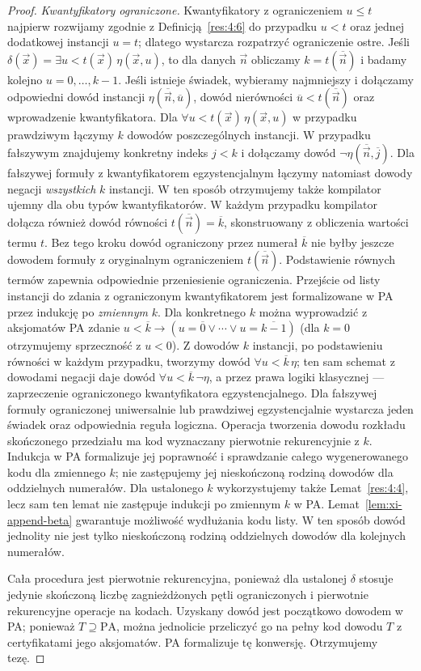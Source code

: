 \begin{proof}
\emph{Kwantyfikatory ograniczone.} Kwantyfikatory
z ograniczeniem $u\le t$ najpierw rozwijamy zgodnie
z Definicją~\ref{res:4:6} do przypadku $u<t$ oraz
jednej dodatkowej instancji $u=t$; dlatego wystarcza
rozpatrzyć ograniczenie ostre. Jeśli
$\delta(\vec x)=\exists u<t(\vec x)\,\eta(\vec x,u)$,
to dla danych $\vec n$ obliczamy
$k=t(\overline{\vec n})$ i badamy kolejno
$u=0,\ldots,k-1$. Jeśli istnieje świadek,
wybieramy najmniejszy i dołączamy odpowiedni
dowód instancji $\eta(\overline{\vec n},\overline u)$,
dowód nierówności $\overline u<t(\overline{\vec n})$
oraz wprowadzenie kwantyfikatora. Dla
$\forall u<t(\vec x)\,\eta(\vec x,u)$ w przypadku
prawdziwym łączymy $k$ dowodów poszczególnych
instancji. W przypadku fałszywym znajdujemy
konkretny indeks $j<k$ i dołączamy dowód
$\neg\eta(\overline{\vec n},\overline j)$.
Dla fałszywej formuły z kwantyfikatorem egzystencjalnym
łączymy natomiast dowody negacji \emph{wszystkich}
$k$ instancji. W ten sposób otrzymujemy także
kompilator ujemny dla obu typów kwantyfikatorów.
W każdym przypadku kompilator dołącza również dowód
równości $t(\overline{\vec n})=\overline k$,
skonstruowany z obliczenia wartości termu $t$.
Bez tego kroku dowód ograniczony przez numerał
$\overline k$ nie byłby jeszcze dowodem formuły
z oryginalnym ograniczeniem $t(\overline{\vec n})$.
Podstawienie równych termów zapewnia odpowiednie
przeniesienie ograniczenia.
Przejście od listy instancji do zdania z ograniczonym
kwantyfikatorem jest formalizowane w PA przez
indukcję po \emph{zmiennym} $k$. Dla konkretnego $k$
można wyprowadzić z aksjomatów PA zdanie
$u<\overline k\to(u=\overline0\lor\cdots\lor
u=\overline{k-1})$ (dla $k=0$ otrzymujemy sprzeczność
z $u<0$). Z dowodów $k$ instancji, po podstawieniu
równości w każdym przypadku, tworzymy dowód
$\forall u<\overline k\,\eta$; ten sam schemat
z dowodami negacji daje dowód
$\forall u<\overline k\,\neg\eta$, a przez prawa
logiki klasycznej --- zaprzeczenie ograniczonego
kwantyfikatora egzystencjalnego. Dla fałszywej formuły
ograniczonej uniwersalnie lub prawdziwej egzystencjalnie
wystarcza jeden świadek oraz odpowiednia reguła logiczna.
Operacja tworzenia dowodu rozkładu skończonego przedziału
ma kod wyznaczany pierwotnie rekurencyjnie z $k$.
Indukcja w PA formalizuje jej poprawność i sprawdzanie
całego wygenerowanego kodu dla zmiennego $k$;
nie zastępujemy jej nieskończoną rodziną dowodów
dla oddzielnych numerałów. Dla ustalonego $k$
wykorzystujemy także Lemat~\ref{res:4:4}, lecz sam ten lemat
nie zastępuje indukcji po zmiennym $k$ w PA.
Lemat~\ref{lem:xi-append-beta} gwarantuje możliwość
wydłużania kodu listy. W ten sposób dowód jednolity
nie jest tylko nieskończoną rodziną oddzielnych
dowodów dla kolejnych numerałów.

Cała procedura jest pierwotnie rekurencyjna,
ponieważ dla ustalonej $\delta$ stosuje jedynie
skończoną liczbę zagnieżdżonych pętli ograniczonych
i pierwotnie rekurencyjne operacje na kodach.
Uzyskany dowód jest początkowo dowodem w PA;
ponieważ $T\supseteq\mathrm{PA}$, można
jednolicie przeliczyć go na pełny kod dowodu $T$
z certyfikatami jego aksjomatów. PA formalizuje
tę konwersję. Otrzymujemy tezę.
\end{proof}

